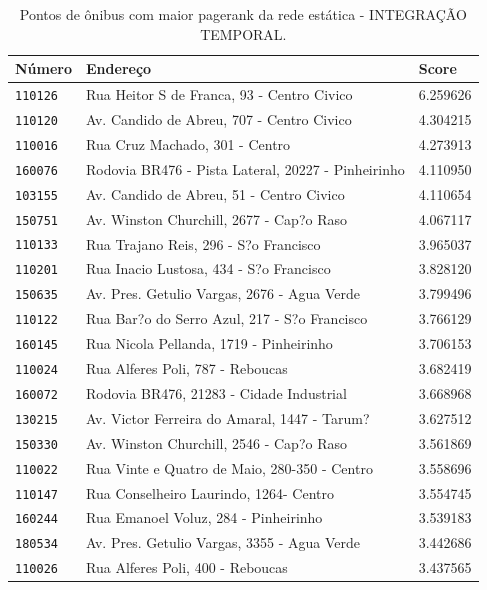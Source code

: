 \begin{table}[htb]
    \caption{Pontos de ônibus com maior pagerank da rede estática - INTEGRAÇÃO TEMPORAL.}
    \label{tab:pagerank-rede-estatica-integracao-temporal}
    \centering
    \footnotesize
    \begin{tabular}{p{1.0cm}p{8.0cm}p{3.0cm} } 
        \hline
        Número & Endereço  & Score \\
        \hline
           \texttt{110126} &          Rua Heitor S de Franca, 93 - Centro Civico &   6.259626 \\
           \texttt{110120} &           Av. Candido de Abreu, 707 - Centro Civico &   4.304215 \\
           \texttt{110016} &                      Rua Cruz Machado, 301 - Centro &   4.273913 \\
           \texttt{160076} &  Rodovia BR476 - Pista Lateral, 20227 - Pinheirinho &   4.110950 \\
           \texttt{103155} &           Av. Candido de Abreu, 51  - Centro Civico &   4.110654 \\
           \texttt{150751} &            Av. Winston Churchill, 2677 - Cap?o Raso &   4.067117 \\
           \texttt{110133} &               Rua Trajano Reis, 296 - S?o Francisco &   3.965037 \\
           \texttt{110201} &             Rua Inacio Lustosa, 434 - S?o Francisco &   3.828120 \\
           \texttt{150635} &         Av. Pres. Getulio Vargas, 2676 - Agua Verde &   3.799496 \\
           \texttt{110122} &        Rua Bar?o do Serro Azul, 217 - S?o Francisco &   3.766129 \\
           \texttt{160145} &             Rua Nicola Pellanda, 1719 - Pinheirinho &   3.706153 \\
           \texttt{110024} &                    Rua Alferes Poli, 787 - Reboucas &   3.682419 \\
           \texttt{160072} &            Rodovia BR476, 21283 - Cidade Industrial &   3.668968 \\
           \texttt{130215} &        Av. Victor Ferreira do Amaral, 1447 - Tarum? &   3.627512 \\
           \texttt{150330} &            Av. Winston Churchill, 2546 - Cap?o Raso &   3.561869 \\
           \texttt{110022} &        Rua Vinte e Quatro de Maio, 280-350 - Centro &   3.558696 \\
           \texttt{110147} &              Rua Conselheiro Laurindo, 1264- Centro &   3.554745 \\
           \texttt{160244} &                Rua Emanoel Voluz, 284 - Pinheirinho &   3.539183 \\
           \texttt{180534} &         Av. Pres. Getulio Vargas, 3355 - Agua Verde &   3.442686 \\
           \texttt{110026} &                    Rua Alferes Poli, 400 - Reboucas &   3.437565 \\
        \hline  
    \end{tabular}
\end{table}


